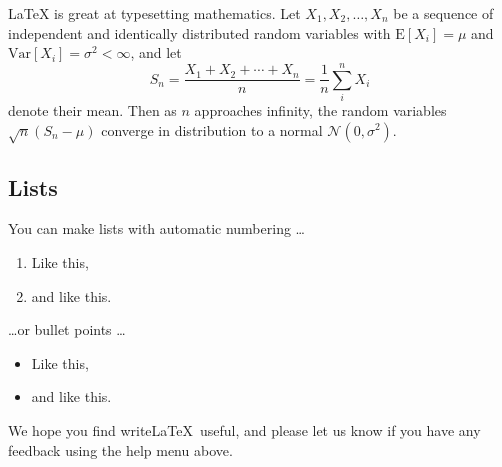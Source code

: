 \documentclass[12pt]{article}
\begin{document}
\LaTeX{} is great at typesetting mathematics. Let $X_1, X_2, \ldots, X_n$ be a sequence of independent and identically distributed random variables with $\text{E}[X_i] = \mu$ and $\text{Var}[X_i] = \sigma^2 < \infty$, and let
$$S_n = \frac{X_1 + X_2 + \cdots + X_n}{n}
      = \frac{1}{n}\sum_{i}^{n} X_i$$
denote their mean. Then as $n$ approaches infinity, the random variables $\sqrt{n}(S_n - \mu)$ converge in distribution to a normal $\mathcal{N}(0, \sigma^2)$.

\subsection{Lists}

You can make lists with automatic numbering \dots

\begin{enumerate}
\item Like this,
\item and like this.
\end{enumerate}
\dots or bullet points \dots
\begin{itemize}
\item Like this,
\item and like this.
\end{itemize}

We hope you find write\LaTeX\ useful, and please let us know if you have any feedback using the help menu above.
\end{document}
